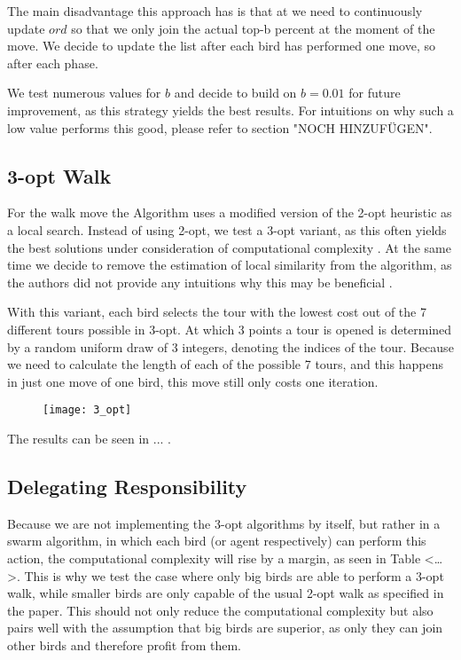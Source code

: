 The main disadvantage this approach has is that at we need to continuously update $ord$ so that we only join the actual top-b percent at the moment of the move. We decide to update the list after each bird has performed one move, so after each phase.

We test numerous values for $b$ and decide to build on $b=0.01$ for future improvement, as this strategy yields the best results. For intuitions on why such a low value performs this good, please refer to section "NOCH HINZUFÜGEN".

\subsection{3-opt Walk}

For the walk move the Algorithm uses a modified version of the 2-opt heuristic as a local search. Instead of using 2-opt, we test a 3-opt variant, as this often yields the best solutions under consideration of computational complexity \cite{lin}. At the same time we decide to remove the estimation of local similarity from the algorithm, as the authors did not provide any intuitions why this may be beneficial \cite{afb}.

With this variant, each bird selects the tour with the lowest cost out of the 7 different tours possible in 3-opt. At which 3 points a tour is opened is determined by a random uniform draw of 3 integers, denoting the indices of the tour. Because we need to calculate the length of each of the possible 7 tours, and this happens in just one move of one bird, this move still only costs one iteration.

\begin{figure}[htbp]
\centerline{\texttt{[image: 3\_opt]}}
\caption{\cite{3_opt}}
\label{3_opt}
\end{figure}

The results can be seen in ... .

\subsection{Delegating Responsibility}

Because we are not implementing the 3-opt algorithms by itself, but rather in a swarm algorithm, in which each bird (or agent respectively) can perform this action, the computational complexity will rise by a margin, as seen in Table <…>. This is why we test the case where only big birds are able to perform a 3-opt walk, while smaller birds are only capable of the usual 2-opt walk as specified in the paper. This should not only reduce the computational complexity but also pairs well with the assumption that big birds are superior, as only they can join other birds and therefore profit from them.

